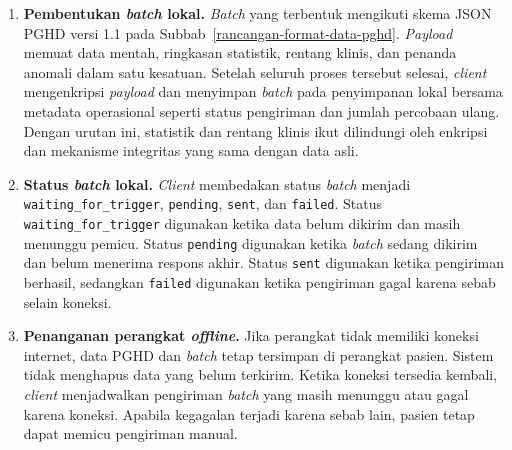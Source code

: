 \begin{enumerate}
    \item \textbf{Pembentukan \textit{batch} lokal.}
    \textit{Batch} yang terbentuk mengikuti skema JSON PGHD versi 1.1 pada Subbab~\ref{rancangan-format-data-pghd}. \textit{Payload} memuat data mentah, ringkasan statistik, rentang klinis, dan penanda anomali dalam satu kesatuan. Setelah seluruh proses tersebut selesai, \textit{client} mengenkripsi \textit{payload} dan menyimpan \textit{batch} pada penyimpanan lokal bersama metadata operasional seperti status pengiriman dan jumlah percobaan ulang. Dengan urutan ini, statistik dan rentang klinis ikut dilindungi oleh enkripsi dan mekanisme integritas yang sama dengan data asli.

    \item \textbf{Status \textit{batch} lokal.}
    \textit{Client} membedakan status \textit{batch} menjadi \texttt{waiting\_for\_trigger}, \texttt{pending}, \texttt{sent}, dan \texttt{failed}. 
    Status \texttt{waiting\_for\_trigger} digunakan ketika data belum dikirim dan masih menunggu pemicu. 
    Status \texttt{pending} digunakan ketika \textit{batch} sedang dikirim dan belum menerima respons akhir. 
    Status \texttt{sent} digunakan ketika pengiriman berhasil, sedangkan \texttt{failed} digunakan ketika pengiriman gagal karena sebab selain koneksi.

    \item \textbf{Penanganan perangkat \textit{offline}.}
    Jika perangkat tidak memiliki koneksi internet, data PGHD dan \textit{batch} tetap tersimpan di perangkat pasien. 
    Sistem tidak menghapus data yang belum terkirim. 
    Ketika koneksi tersedia kembali, \textit{client} menjadwalkan pengiriman \textit{batch} yang masih menunggu atau gagal karena koneksi. 
    Apabila kegagalan terjadi karena sebab lain, pasien tetap dapat memicu pengiriman manual.
\end{enumerate}
